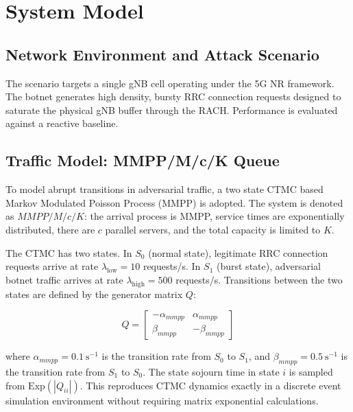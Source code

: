 \documentclass[conference]{IEEEtran}
\begin{document}
\section{System Model}

\subsection{Network Environment and Attack Scenario}

The scenario targets a single gNB cell operating under the 5G NR framework. The botnet generates high density, bursty RRC connection requests designed to saturate the physical gNB buffer through the RACH. Performance is evaluated against a reactive baseline.

\subsection{Traffic Model: MMPP/M/c/K Queue}

To model abrupt transitions in adversarial traffic, a two state CTMC based Markov Modulated Poisson Process (MMPP) is adopted. The system is denoted as $MMPP/M/c/K$: the arrival process is MMPP, service times are exponentially distributed, there are $c$ parallel servers, and the total capacity is limited to $K$.

The CTMC has two states. In $S_0$ (normal state), legitimate RRC connection requests arrive at rate $\lambda_{\mathrm{low}} = 10$ requests/s. In $S_1$ (burst state), adversarial botnet traffic arrives at rate $\lambda_{\mathrm{high}} = 500$ requests/s. Transitions between the two states are defined by the generator matrix $Q$:

\begin{equation}
Q = \begin{bmatrix}
    -\alpha_{mmpp} & \alpha_{mmpp} \\
    \beta_{mmpp}   & -\beta_{mmpp}
\end{bmatrix}
\label{eq:generator}
\end{equation}

where $\alpha_{mmpp} = 0.1\ \mathrm{s}^{-1}$ is the transition rate from $S_0$ to $S_1$, and $\beta_{mmpp} = 0.5\ \mathrm{s}^{-1}$ is the transition rate from $S_1$ to $S_0$. The state sojourn time in state $i$ is sampled from $\mathrm{Exp}(|Q_{ii}|)$. This reproduces CTMC dynamics exactly in a discrete event simulation environment without requiring matrix exponential calculations.
\end{document}
